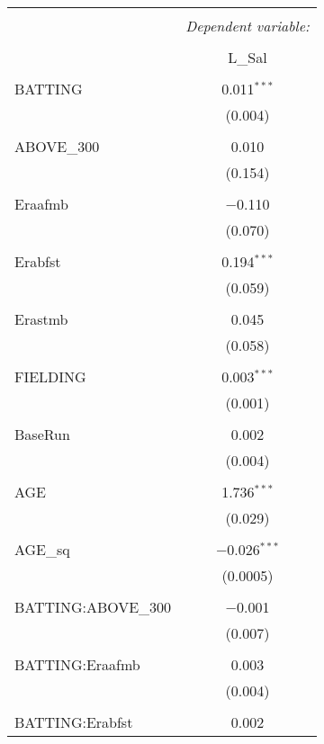 
\begin{table}[!htbp] \centering
  \caption{}
  \label{}
  \scriptsize
\begin{tabular}{@{\extracolsep{5pt}}lc}
\\[-1.8ex]\hline
\hline \\[-1.8ex]
 & \multicolumn{1}{c}{\textit{Dependent variable:}} \\
\cline{2-2}
\\[-1.8ex] & L\_Sal \\
\hline \\[-1.8ex]
 BATTING & 0.011$^{***}$ \\
  & (0.004) \\
  & \\
 ABOVE\_300 & 0.010 \\
  & (0.154) \\
  & \\
 Eraafmb & $-$0.110 \\
  & (0.070) \\
  & \\
 Erabfst & 0.194$^{***}$ \\
  & (0.059) \\
  & \\
 Erastmb & 0.045 \\
  & (0.058) \\
  & \\
 FIELDING & 0.003$^{***}$ \\
  & (0.001) \\
  & \\
 BaseRun & 0.002 \\
  & (0.004) \\
  & \\
 AGE & 1.736$^{***}$ \\
  & (0.029) \\
  & \\
 AGE\_sq & $-$0.026$^{***}$ \\
  & (0.0005) \\
  & \\
 BATTING:ABOVE\_300 & $-$0.001 \\
  & (0.007) \\
  & \\
 BATTING:Eraafmb & 0.003 \\
  & (0.004) \\
  & \\
 BATTING:Erabfst & 0.002 \\

\end{tabular}
\end{table}
